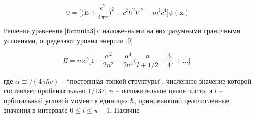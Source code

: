 \documentclass[a5paper,10pt]{article}
\begin{document}
\begin{equation}
\label{formula3}
\tag{1.1.5}
0 = \biggl[\biggl(E+\frac{e^2}{4\pi r}\biggr)^2-c^2\hbar^2\nabla^2-m^2c^4\biggr]\psi (\mathbf{x})
\end{equation}

\noindent Решения уравнения \eqref{formula3} с наложенными на них разумными граничными условиями, определяют уровни энергии [9]

\begin{equation}
\tag{1.1.6}
E = mc^2\biggl[1-\frac{\alpha^2}{2n^2}-\frac{\alpha^4}{2n^4}\biggl(\frac{n}{l+1/2}-\frac{3}{4}\biggl)+\ldots \biggr],
\end{equation}

\noindent где $\alpha\equiv /(4\pi\hbar c)$ -- ``постоянная тонкой структуры'', численное значение которой составляет приблизительно $1/137$, $n$ -- положительное целое число, а $l$ -- орбитальный угловой момент в единицах $\hbar$, принимающий целочисленные значения в интервале $0\le l\le n-1$. Наличие
\end{document}
